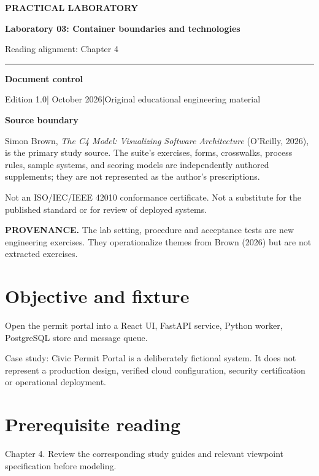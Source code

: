 \documentclass[10pt,letterpaper]{article}
\newcommand{\SourceNote}[1]{\par\smallskip\noindent\colorbox{C4Light}{\parbox{0.94\linewidth}{\footnotesize\textbf{PROVENANCE.} #1}}\par\medskip}
\newcommand{\DocStart}[3]{%
\begin{document}
\begin{titlepage}
\renewcommand{\thepage}{title-\arabic{page}}
\vspace*{0.55in}
{\sffamily\bfseries\small\color{C4Teal}#1}\par\vspace{0.24in}
{\sffamily\bfseries\fontsize{26}{31}\selectfont\color{C4Navy}#2}\par\vspace{0.18in}
{\large\color{C4Gray}#3}\par\vspace{0.4in}
\textcolor{C4Teal}{\rule{\linewidth}{1.15pt}}\par\vspace{0.24in}
\textbf{Document control}\par
Edition 1.0\quad|\quad 30 October 2026\quad|\quad Original educational engineering material\par
\vspace{0.17in}
\textbf{Source boundary}\par
Simon Brown, \emph{The C4 Model: Visualizing Software Architecture} (O'Reilly, 2026), is the primary study source. The suite's exercises, forms, crosswalks, process rules, sample systems, and scoring models are independently authored supplements; they are not represented as the author's prescriptions.\par
\vfill
{\small\color{C4Gray}Not an ISO/IEC/IEEE 42010 conformance certificate. Not a substitute for the published standard or for review of deployed systems.}\par
\end{titlepage}
}
\DocStart{PRACTICAL LABORATORY}{Laboratory 03: Container boundaries and technologies}{Reading alignment: Chapter 4}
\SourceNote{The lab setting, procedure and acceptance tests are new engineering exercises. They operationalize themes from Brown (2026) but are not extracted exercises.}
\section{Objective and fixture}
Open the permit portal into a React UI, FastAPI service, Python worker, PostgreSQL store and message queue.

Case study: Civic Permit Portal is a deliberately fictional system. It does not represent a production design, verified cloud configuration, security certification or operational deployment.


\section{Prerequisite reading}
Chapter 4. Review the corresponding study guides and relevant viewpoint specification before modeling.
\end{document}
